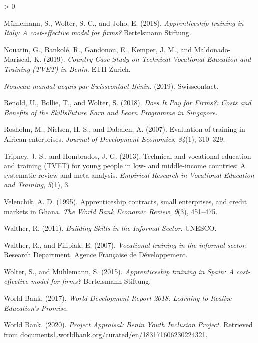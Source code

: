 \documentclass[
  11pt,
a4paper
]{article}
\newlength{\cslhangindent}
\newenvironment{CSLReferences}[2] %
 {%
  \setlength{\parindent}{0pt}
  \ifodd #1 \everypar{\setlength{\hangindent}{\cslhangindent}}\ignorespaces\fi
  \ifnum #2 > 0
  \setlength{\parskip}{#2\baselineskip}
  \fi
 }%
 {}
\begin{document}
\begin{CSLReferences}{1}{0}
\leavevmode\hypertarget{ref-muhlemann2018}{}%
Mühlemann, S., Wolter, S. C., and Joho, E. (2018). \emph{Apprenticeship training in {Italy}: {A} cost-effective model for firms?} {Bertelsmann Stiftung}.

\leavevmode\hypertarget{ref-nouatin2019}{}%
Nouatin, G., Bankolé, R., Gandonou, E., Kemper, J. M., and Maldonado-Mariscal, K. (2019). \emph{Country {Case Study} on {Technical Vocational Education} and {Training} ({TVET}) in {Benin}}. {ETH Zurich}.

\leavevmode\hypertarget{ref-swisscontact2019}{}%
\emph{Nouveau mandat acquis par {Swisscontact Bénin}}. (2019). {Swisscontact}.

\leavevmode\hypertarget{ref-renold2018}{}%
Renold, U., Bollie, T., and Wolter, S. (2018). \emph{Does {It Pay} for {Firms}?: {Costs} and {Benefits} of the {SkillsFuture Earn} and {Learn Programme} in {Singapore}}.

\leavevmode\hypertarget{ref-rosholm2007}{}%
Rosholm, M., Nielsen, H. S., and Dabalen, A. (2007). Evaluation of training in {African} enterprises. \emph{Journal of Development Economics}, \emph{84}(1), 310--329.

\leavevmode\hypertarget{ref-tripney2013}{}%
Tripney, J. S., and Hombrados, J. G. (2013). Technical and vocational education and training ({TVET}) for young people in low- and middle-income countries: A systematic review and meta-analysis. \emph{Empirical Research in Vocational Education and Training}, \emph{5}(1), 3.

\leavevmode\hypertarget{ref-velenchik1995}{}%
Velenchik, A. D. (1995). Apprenticeship contracts, small enterprises, and credit markets in {Ghana}. \emph{The World Bank Economic Review}, \emph{9}(3), 451--475.

\leavevmode\hypertarget{ref-walther2011}{}%
Walther, R. (2011). \emph{Building {Skills} in the {Informal Sector}}. {UNESCO}.

\leavevmode\hypertarget{ref-walther2007}{}%
Walther, R., and Filipiak, E. (2007). \emph{Vocational training in the informal sector}. {Research Department, Agence Française de Développement}.

\leavevmode\hypertarget{ref-wolter2015}{}%
Wolter, S., and Mühlemann, S. (2015). \emph{Apprenticeship training in {Spain}: {A} cost-effective model for firms?} {Bertelsmann Stiftung}.

\leavevmode\hypertarget{ref-worldbank2017}{}%
World Bank. (2017). \emph{World {Development Report} 2018: {Learning} to {Realize Education}'s {Promise}}.

\leavevmode\hypertarget{ref-worldbank2020}{}%
World Bank. (2020). \emph{Project {Appraisal}: {Benin Youth Inclusion Project}}. Retrieved from documents1.worldbank.org/curated/en/183171606230224321.

\end{CSLReferences}
\end{document}
